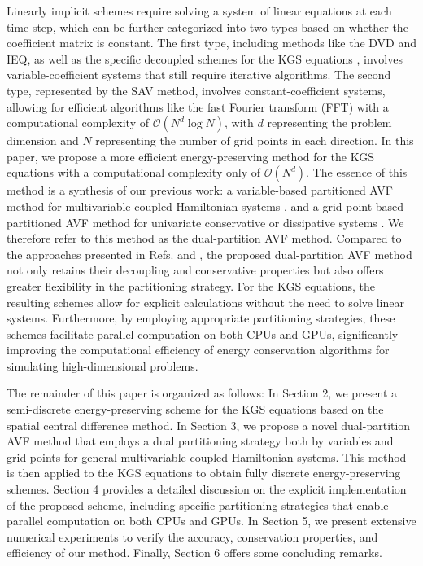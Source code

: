 \documentclass[fleqn,11pt]{elsarticle}
\numberwithin{equation}{section}
\begin{document}
Linearly implicit schemes require solving a system of linear equations at each time step, which can be further categorized into two types based on whether the coefficient matrix is constant. The first type, including methods like the DVD and IEQ, as well as the specific decoupled schemes for the KGS equations \cite{kgs_cifd, li2019a,kgs_difd, yang2021}, involves variable-coefficient systems that still require iterative algorithms. The second type, represented by the SAV method, involves constant-coefficient systems, allowing for efficient algorithms like the fast Fourier transform (FFT) with a computational complexity of $\mathcal{O}(N^d \log N)$, with $d$ representing the problem dimension and $N$ representing the number of grid points in each direction. In this paper, we propose a more efficient energy-preserving method for the KGS equations with a computational complexity only of $\mathcal{O}(N^d)$. The essence of this method is a synthesis of our previous work: a variable-based partitioned AVF method for multivariable coupled Hamiltonian systems \cite{pavf}, and a grid-point-based partitioned AVF method for univariate conservative or dissipative systems \cite{cai_cmame}. We therefore refer to this method as the dual-partition AVF method.  Compared to the approaches presented in Refs. \cite{pavf} and \cite{cai_cmame}, the proposed dual-partition AVF method not only retains their decoupling and conservative properties but also offers greater flexibility in the partitioning strategy. For the KGS equations, the resulting schemes allow for explicit calculations without the need to solve linear systems. Furthermore, by employing appropriate partitioning strategies, these schemes facilitate parallel computation on both CPUs and GPUs, significantly improving the computational efficiency of energy conservation algorithms for simulating high-dimensional problems.


The remainder of this paper is organized as follows: In Section 2, we present a semi-discrete energy-preserving scheme for the KGS equations based on the spatial central difference method. In Section 3, we propose a novel dual-partition AVF method that employs a dual partitioning strategy both by variables and grid points for general multivariable coupled Hamiltonian systems. This method is then applied to the KGS equations to obtain fully discrete energy-preserving schemes. Section 4 provides a detailed discussion on the explicit implementation of the proposed scheme, including specific partitioning strategies that enable parallel computation on both CPUs and GPUs. In Section 5, we present extensive numerical experiments to verify the accuracy, conservation properties, and efficiency of our method. Finally, Section 6 offers some concluding remarks.
\end{document}
